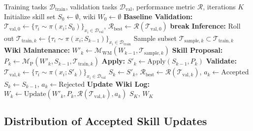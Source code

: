 \documentclass[11pt, a4paper, copyright, gr]{google}
\begin{document}
\begin{algorithm}
\begin{algorithmic}[1]
\Require Training tasks $\mathcal{D}_{\text{train}}$, validation tasks $\mathcal{D}_{\text{val}}$, performance metric $\mathcal{R}$, iterations $K$
\State Initialize skill set $S_0 \leftarrow \emptyset$, wiki $W_0 \leftarrow \emptyset$
\State \textbf{Baseline Validation:} $\mathcal{T}_{\text{val}, 0} \leftarrow \{ \tau_i \sim \pi(x_i; S_0) \}_{x_i \in \mathcal{D}_{\text{val}}}$, \quad $\mathcal{R}_{\text{best}} \leftarrow \mathcal{R}(\mathcal{T}_{\text{val}, 0})$
    \State \textbf{break}
  \EndIf
  \State \textbf{Inference:} Roll out $\mathcal{T}_{\text{train}, k} \leftarrow \{ \tau_i \sim \pi(x_i; S_{k-1}) \}_{x_i \in \mathcal{D}_{\text{train}}}$
  \State Sample subset $\mathcal{T}_{\text{sample}, k} \subset \mathcal{T}_{\text{train}, k}$
  \State \textbf{Wiki Maintenance:} $W'_k \leftarrow \mathcal{M}_{\text{WM}}(W_{k-1}, \mathcal{T}_{\text{sample}, k})$
  \State \textbf{Skill Proposal:} $P_k \leftarrow \mathcal{M}_{\text{P}}(W'_k, S_{k-1}, \mathcal{T}_{\text{train}, k})$
  \State \textbf{Apply:} $S'_k \leftarrow \text{Apply}(S_{k-1}, P_k)$
  \State \textbf{Validate:} $\mathcal{T}_{\text{val}, k} \leftarrow \{ \tau_i \sim \pi(x_i; S'_k) \}_{x_i \in \mathcal{D}_{\text{val}}}$
    \State $S_k \leftarrow S'_k$, \quad $\mathcal{R}_{\text{best}} \leftarrow \mathcal{R}(\mathcal{T}_{\text{val}, k})$, \quad $a_k \leftarrow \text{Accepted}$
  \Else
    \State $S_k \leftarrow S_{k-1}$, \quad $a_k \leftarrow \text{Rejected}$ 
  \EndIf
  \State \textbf{Update Wiki Log:} $W_k \leftarrow \text{Update}(W'_k, P_k, \mathcal{R}(\mathcal{T}_{\text{val}, k}), a_k)$
\EndFor
\State \Return $S_K$, $W_K$
\end{algorithmic}
\caption{\textbf{WikiSkill evolution loop.} At each iteration $k$, the inference agent rolls out on training tasks using active skills $S_{k-1}$, the maintainer consolidates sampled traces into the intermediate wiki $W'_k$, the proposer generates candidate skill modifications $P_k$, validation gating determines whether to accept $S'_k$ or roll back to $S_{k-1}$, and the system appends the proposal outcome and skill diff to produce the final wiki state $W_k$.}
\label{alg:wikiskill_evolution}
\end{algorithm}

\subsection{Distribution of Accepted Skill Updates}
\end{document}
